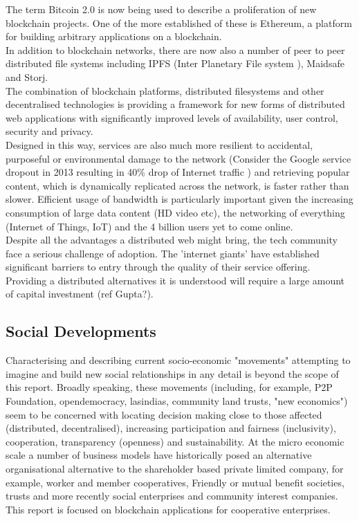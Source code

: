 The term Bitcoin 2.0 is now being used to describe a proliferation of new blockchain projects. One of the more established of these is Ethereum\cite{Ethereum}, a platform for building arbitrary applications on a blockchain.\\ 

In addition to blockchain networks, there are now also a number of peer to peer distributed file systems including IPFS (Inter Planetary File system \cite{Ipfs}), Maidsafe\cite{Maidsafe} and Storj\cite{Storj}. \\

The combination of blockchain platforms, distributed filesystems and other decentralised technologies is providing a framework for new forms of distributed web applications with significantly improved levels of availability, user control, security and privacy. \\

Designed in this way, services are also much more resilient to accidental, purposeful or environmental damage to the network (Consider the Google service dropout in 2013 resulting in 40\% drop of Internet traffic \cite{Google_outage}) and retrieving popular content, which is dynamically replicated across the network, is faster rather than slower. Efficient usage of bandwidth is particularly important given the increasing consumption of large data content (HD video etc), the networking of everything (Internet of Things, IoT) and the 4 billion users yet to come online\cite{Coming_online}.\\

Despite all the advantages a distributed web might bring, the tech community face a serious challenge of adoption. The 'internet giants' have established significant barriers to entry through the quality of their service offering. Providing a distributed alternatives it is understood will require a large amount of capital investment (ref Gupta?). \\

\subsection{Social Developments}
Characterising and describing current socio-economic "movements" attempting to imagine and build new social relationships in any detail is beyond the scope of this report. Broadly speaking, these movements (including, for example, P2P Foundation, opendemocracy, lasindias, community land trusts, "new economics") seem to be concerned with locating decision making close to those affected (distributed, decentralised), increasing participation and fairness (inclusivity), cooperation, transparency (openness) and sustainability. At the micro economic scale a number of business models have historically posed an alternative organisational alternative to the shareholder based private limited company, for example, worker and member cooperatives, Friendly or mutual benefit societies, trusts and more recently social enterprises and community interest companies. This report is focused on blockchain applications for cooperative enterprises. \\

